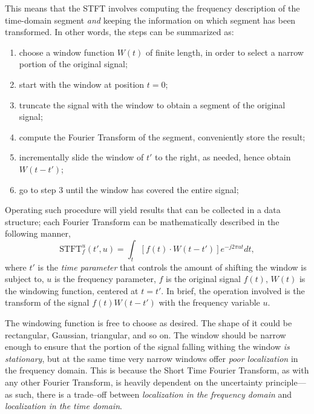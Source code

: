 \documentclass[\documentfontsize, twocolumn]{\classname}
\begin{document}
This means that the STFT involves computing the frequency description of the
time-domain segment \emph{and} keeping the information on which segment has
been transformed. In other words, the steps can be summarized as:
\begin{enumerate}
    \item choose a window function $W(t)$ of finite length, in order to select a
        narrow portion of the original signal;
    \item start with the window at position $t = 0$;
    \item truncate the signal with the window to obtain a segment of the
        original signal;
    \item compute the Fourier Transform of the segment, conveniently store the
        result;
    \item incrementally slide the window of $t'$ to the right, as needed, hence
        obtain $W(t - t')$;
    \item go to step $3$ until the window has covered the entire signal;
\end{enumerate}

Operating such procedure will yield results that can be collected in a data
structure; each Fourier Transform can be mathematically described in the following manner,
\begin{equation}\label{eqn:shortTimeFourierTransform}
    \mathrm{STFT}^u_f(t', u) = \int_t \left[f(t) \cdot W(t - t')\right]e^{-j2\pi ut}dt,
\end{equation}
where $t'$ is the \emph{time parameter} that controls the amount of shifting the window is subject to, $u$ is the frequency parameter, $f$ is the original signal $f(t)$, $W(t)$ is the windowing function, centered at $t = t'$. In brief, the operation involved is the transform of the signal $f(t)W(t - t')$ with the frequency variable $u$.

The windowing function is free to choose as desired. The shape of it could be rectangular, Gaussian, triangular, and so on. The window should be narrow enough to ensure that the portion of the signal falling withing the window \emph{is stationary}, but at the same time very narrow windows offer \emph{poor localization} in the frequency domain. This is because the Short Time Fourier Transform, as with any other Fourier Transform, is heavily dependent on the uncertainty principle---as such, there is a trade--off between \emph{localization in the frequency domain} and \emph{localization in the time domain}.
\end{document}
